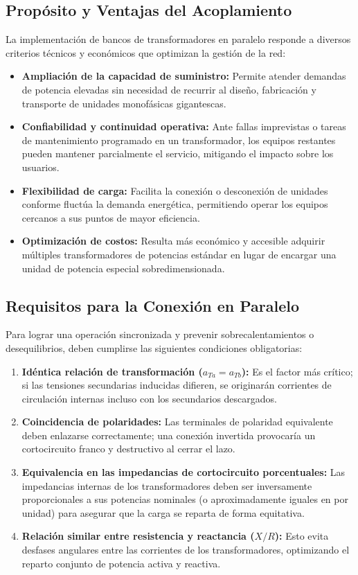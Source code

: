 \subsection{Propósito y Ventajas del Acoplamiento}
La implementación de bancos de transformadores en paralelo responde a diversos criterios técnicos y económicos que optimizan la gestión de la red:
\begin{itemize}
    \item \textbf{Ampliación de la capacidad de suministro:} Permite atender demandas de potencia elevadas sin necesidad de recurrir al diseño, fabricación y transporte de unidades monofásicas gigantescas.
    \item \textbf{Confiabilidad y continuidad operativa:} Ante fallas imprevistas o tareas de mantenimiento programado en un transformador, los equipos restantes pueden mantener parcialmente el servicio, mitigando el impacto sobre los usuarios.
    \item \textbf{Flexibilidad de carga:} Facilita la conexión o desconexión de unidades conforme fluctúa la demanda energética, permitiendo operar los equipos cercanos a sus puntos de mayor eficiencia.
    \item \textbf{Optimización de costos:} Resulta más económico y accesible adquirir múltiples transformadores de potencias estándar en lugar de encargar una unidad de potencia especial sobredimensionada.
\end{itemize}

\subsection{Requisitos para la Conexión en Paralelo}
Para lograr una operación sincronizada y prevenir sobrecalentamientos o desequilibrios, deben cumplirse las siguientes condiciones obligatorias:
\begin{enumerate}
    \item \textbf{Idéntica relación de transformación ($a_{Ta} = a_{Tb}$):} Es el factor más crítico; si las tensiones secundarias inducidas difieren, se originarán corrientes de circulación internas incluso con los secundarios descargados.
    \item \textbf{Coincidencia de polaridades:} Las terminales de polaridad equivalente deben enlazarse correctamente; una conexión invertida provocaría un cortocircuito franco y destructivo al cerrar el lazo.
    \item \textbf{Equivalencia en las impedancias de cortocircuito porcentuales:} Las impedancias internas de los transformadores deben ser inversamente proporcionales a sus potencias nominales (o aproximadamente iguales en por unidad) para asegurar que la carga se reparta de forma equitativa.
    \item \textbf{Relación similar entre resistencia y reactancia ($X/R$):} Esto evita desfases angulares entre las corrientes de los transformadores, optimizando el reparto conjunto de potencia activa y reactiva.
\end{enumerate}

